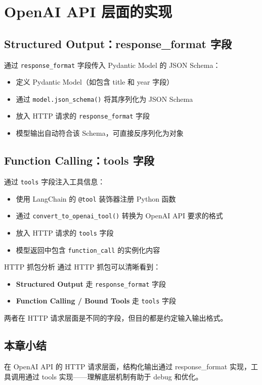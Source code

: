 \section{OpenAI API 层面的实现}

\subsection{Structured Output：response\_format 字段}

通过 \texttt{response\_format} 字段传入 Pydantic Model 的 JSON Schema：

\begin{itemize}
    \item 定义 Pydantic Model（如包含 title 和 year 字段）
    \item 通过 \texttt{model.json\_schema()} 将其序列化为 JSON Schema
    \item 放入 HTTP 请求的 \texttt{response\_format} 字段
    \item 模型输出自动符合该 Schema，可直接反序列化为对象
\end{itemize}

\subsection{Function Calling：tools 字段}

通过 \texttt{tools} 字段注入工具信息：

\begin{itemize}
    \item 使用 LangChain 的 \texttt{@tool} 装饰器注册 Python 函数
    \item 通过 \texttt{convert\_to\_openai\_tool()} 转换为 OpenAI API 要求的格式
    \item 放入 HTTP 请求的 \texttt{tools} 字段
    \item 模型返回中包含 \texttt{function\_call} 的实例化内容
\end{itemize}

\begin{knowledgebox}{HTTP 抓包分析}
通过 HTTP 抓包可以清晰看到：
\begin{itemize}
    \item \textbf{Structured Output} 走 \texttt{response\_format} 字段
    \item \textbf{Function Calling / Bound Tools} 走 \texttt{tools} 字段
\end{itemize}
两者在 HTTP 请求层面是不同的字段，但目的都是约定输入输出格式。
\end{knowledgebox}

\subsection{本章小结}

在 OpenAI API 的 HTTP 请求层面，结构化输出通过 response\_format 实现，工具调用通过 tools 实现——理解底层机制有助于 debug 和优化。

